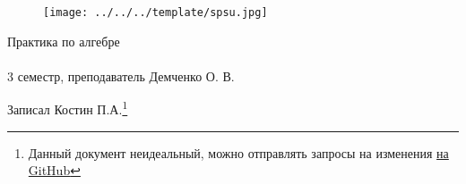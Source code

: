 \documentclass[main]{subfiles}
\begin{document}
	\begin{figure}[H]
			\texttt{[image: ../../../template/spsu.jpg]}
			\centering
	\end{figure}
	\vspace*{\fill}
	\begin{center}
		\huge Практика по алгебре\\ \ \\
		\Large 3 семестр, преподаватель Демченко О. В.

		\large Записал Костин П.А.\footnote{Данный документ неидеальный, можно отправлять запросы на изменения \href{https://github.com/KostinP/Mathematical-LecturesAndPractices}{на GitHub}}
	\end{center}
	\vspace*{\fill}
	\vspace*{\fill}

	\newpage
	\tableofcontents
	\newpage
\end{document}
